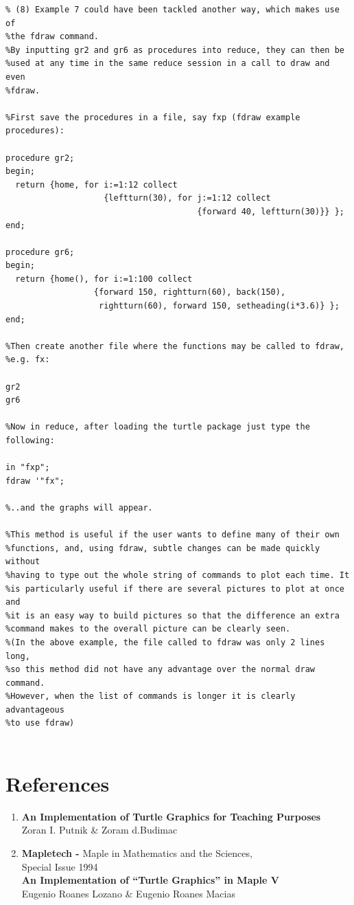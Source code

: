\documentclass[11pt]{article}
\begin{document}
\begin{verbatim}
% (8) Example 7 could have been tackled another way, which makes use of 
%the fdraw command.
%By inputting gr2 and gr6 as procedures into reduce, they can then be 
%used at any time in the same reduce session in a call to draw and even
%fdraw.

%First save the procedures in a file, say fxp (fdraw example procedures):

procedure gr2;
begin;
  return {home, for i:=1:12 collect
                    {leftturn(30), for j:=1:12 collect
                                       {forward 40, leftturn(30)}} };
end;

procedure gr6;
begin;
  return {home(), for i:=1:100 collect
                  {forward 150, rightturn(60), back(150),
                   rightturn(60), forward 150, setheading(i*3.6)} };
end;

%Then create another file where the functions may be called to fdraw,
%e.g. fx:

gr2
gr6

%Now in reduce, after loading the turtle package just type the following:

in "fxp";
fdraw '"fx";

%..and the graphs will appear.

%This method is useful if the user wants to define many of their own
%functions, and, using fdraw, subtle changes can be made quickly without 
%having to type out the whole string of commands to plot each time. It 
%is particularly useful if there are several pictures to plot at once and 
%it is an easy way to build pictures so that the difference an extra 
%command makes to the overall picture can be clearly seen.
%(In the above example, the file called to fdraw was only 2 lines long,
%so this method did not have any advantage over the normal draw command. 
%However, when the list of commands is longer it is clearly advantageous 
%to use fdraw)


\end{verbatim}


\section{References}

\begin{enumerate}
 \item {\bf An Implementation of Turtle Graphics for Teaching Purposes}\\
         Zoran I. Putnik \& Zoram d.Budimac

 \item {\bf Mapletech -} Maple in Mathematics and the Sciences,\\ 
        Special Issue 1994\\
       {\bf An Implementation of ``Turtle Graphics'' in Maple V}\\
         Eugenio Roanes Lozano \&  Eugenio Roanes Macias

\end{enumerate}
\end{document}
